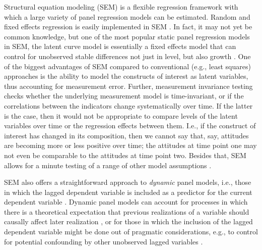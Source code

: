 \documentclass[]{interact}
\theoremstyle{plain}%
\theoremstyle{definition}
\theoremstyle{remark}
\begin{document}
Structural equation modeling (SEM) is a flexible regression framework
with which a large variety of panel regression models can be estimated.
Random and fixed effects regression is easily implemented in SEM
\citep{Bollen2010}. In fact, it may not yet be common knowledge, but one
of the most popular static panel regression models in SEM, the latent
curve model \citep[LCM, which goes by a number of names, such as the
latent growth curve, see][]{Meredith1990} is essentially a fixed effects
model that can control for unobserved stable differences not just in
level, but also growth \citep{Teachman2001, Teachman2014}. One of the
biggest advantages of SEM compared to conventional (e.g., least squares)
approaches is the ability to model the constructs of interest as latent
variables, thus accounting for measurement error. Further, measurement
invariance testing checks whether the underlying measurement model is
time-invariant, or if the correlations between the indicators change
systematically over time. If the latter is the case, then it would not
be appropriate to compare levels of the latent variables over time or
the regression effects between them. I.e., if the construct of interest
has changed in its composition, then we cannot say that, say, attitudes
are becoming more or less positive over time; the attitudes at time
point one may not even be comparable to the attitudes at time point two.
Besides that, SEM allows for a minute testing of a range of other model
assumptions \citep[e.g., constant effects over time, contemporary
vs.~strict vs.~sequential exogeneity,][]{Bollen2010, Bruederl2015}.

SEM also offers a straightforward approach to \emph{dynamic} panel
models, i.e., those in which the lagged dependent variable is included
as a predictor for the current dependent variable
\citep{Zyphur2019a, Zyphur2019b}. Dynamic panel models can account for
processes in which there is a theoretical expectation that previous
realizations of a variable should causally affect later realization
\citep[i.e., state dependence,][]{Heckman1981, Hsiao2014}, or for those
in which the inclusion of the lagged dependent variable might be done
out of pragmatic considerations, e.g., to control for potential
confounding by other unobserved lagged variables \citep{Kuehnel2019}.
\end{document}
